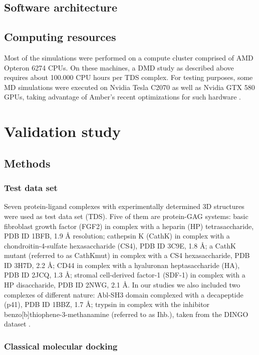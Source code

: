 \subsection{Software architecture}
\lipsum[1-2]


\subsection{Computing resources}

Most of the simulations were performed on a compute cluster comprised of AMD
Opteron 6274 CPUs. On these machines, a DMD study as
described above requires about 100.000 CPU hours per TDS complex.
For testing purposes, some MD simulations were executed on Nvidia Tesla C2070
as well as Nvidia GTX 580 GPUs, taking advantage of Amber's recent optimizations
for such hardware \cite{amber_gpu_2012}.

\lipsum[1-2]


\section{Validation study}
\subsection{Methods}
\subsubsection{Test data set}

Seven protein-ligand complexes with experimentally determined 3D structures were
used as test data set (TDS). Five of them are protein-GAG systems: basic
fibroblast growth factor (FGF2) in complex with a heparin (HP) tetrasaccharide,
PDB ID 1BFB, 1.9 Å resolution; cathepsin K (CathK) in complex with a
chondroitin-4-sulfate hexasaccharide (CS4), PDB ID 3C9E, 1.8 Å; a CathK mutant
(referred to as CathKmut) in complex with a CS4 hexasaccharide, PDB ID 3H7D, 2.2
Å; CD44 in complex with a hyaluronan heptasaccharide (HA), PDB ID 2JCQ, 1.3 Å;
stromal cell-derived factor-1 (SDF-1) in complex with a HP disaccharide, PDB ID
2NWG, 2.1 Å. In our studies we also included two complexes of different nature:
Abl-SH3 domain complexed with a decapeptide (p41), PDB ID 1BBZ, 1.7 Å; trypsin
in complex with the inhibitor benzo[b]thiophene-3-methanamine (referred to as
Ihb.), taken from the DINGO dataset \cite{newman_dingo_2012}.

\subsubsection{Classical molecular docking}

